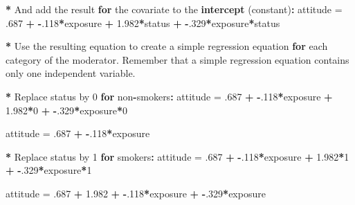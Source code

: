 \documentclass[a4paper]{book}
\newenvironment{Shaded}{\begin{snugshade}}{\end{snugshade}}
\newcommand{\KeywordTok}[1]{\textcolor[rgb]{0,0,0}{\textbf{#1}}}
\newcommand{\DecValTok}[1]{\textcolor[rgb]{0.00,0.00,0.00}{#1}}
\newcommand{\FloatTok}[1]{\textcolor[rgb]{0.00,0.00,0.00}{#1}}
\newcommand{\StringTok}[1]{\textcolor[rgb]{0.00,0.00,0.00}{#1}}
\newcommand{\ControlFlowTok}[1]{\textcolor[rgb]{0.00,0.00,0.00}{\textbf{#1}}}
\newcommand{\OperatorTok}[1]{\textcolor[rgb]{0.00,0.00,0.00}{\textbf{#1}}}
\newcommand{\NormalTok}[1]{#1}
\theoremstyle{definition}
\theoremstyle{definition}
\theoremstyle{definition}
\theoremstyle{remark}
\begin{document}
\begin{Shaded}
\begin{Highlighting}[]
\OperatorTok{*}\StringTok{ }\NormalTok{And add the result }\ControlFlowTok{for}\NormalTok{ the covariate to the }\KeywordTok{intercept}\NormalTok{ (constant)}\OperatorTok{:}
\NormalTok{attitude =}\StringTok{ }\NormalTok{.}\DecValTok{687} \OperatorTok{+}\StringTok{ }\OperatorTok{-}\NormalTok{.}\DecValTok{118}\OperatorTok{*}\NormalTok{exposure }\OperatorTok{+}\StringTok{ }\FloatTok{1.982}\OperatorTok{*}\NormalTok{status }\OperatorTok{+}\StringTok{ }\OperatorTok{-}\NormalTok{.}\DecValTok{329}\OperatorTok{*}\NormalTok{exposure}\OperatorTok{*}\NormalTok{status  }

\OperatorTok{*}\StringTok{ }\NormalTok{Use the resulting equation to create a simple regression equation }\ControlFlowTok{for}\NormalTok{ each}
\NormalTok{category of the moderator. Remember that a simple regression equation contains}
\NormalTok{only one independent variable.}

\OperatorTok{*}\StringTok{ }\NormalTok{Replace status by }\DecValTok{0} \ControlFlowTok{for}\NormalTok{ non}\OperatorTok{-}\NormalTok{smokers}\OperatorTok{:}\StringTok{  }
\StringTok{  }
\NormalTok{attitude =}\StringTok{ }\NormalTok{.}\DecValTok{687} \OperatorTok{+}\StringTok{ }\OperatorTok{-}\NormalTok{.}\DecValTok{118}\OperatorTok{*}\NormalTok{exposure }\OperatorTok{+}\StringTok{ }\FloatTok{1.982}\OperatorTok{*}\DecValTok{0} \OperatorTok{+}\StringTok{ }\OperatorTok{-}\NormalTok{.}\DecValTok{329}\OperatorTok{*}\NormalTok{exposure}\OperatorTok{*}\DecValTok{0}  
  
\NormalTok{attitude =}\StringTok{ }\NormalTok{.}\DecValTok{687} \OperatorTok{+}\StringTok{ }\OperatorTok{-}\NormalTok{.}\DecValTok{118}\OperatorTok{*}\NormalTok{exposure  }
  
\OperatorTok{*}\StringTok{ }\NormalTok{Replace status by }\DecValTok{1} \ControlFlowTok{for}\NormalTok{ smokers}\OperatorTok{:}
\StringTok{  }
\NormalTok{attitude =}\StringTok{ }\NormalTok{.}\DecValTok{687} \OperatorTok{+}\StringTok{ }\OperatorTok{-}\NormalTok{.}\DecValTok{118}\OperatorTok{*}\NormalTok{exposure }\OperatorTok{+}\StringTok{ }\FloatTok{1.982}\OperatorTok{*}\DecValTok{1} \OperatorTok{+}\StringTok{ }\OperatorTok{-}\NormalTok{.}\DecValTok{329}\OperatorTok{*}\NormalTok{exposure}\OperatorTok{*}\DecValTok{1}  
  
\NormalTok{attitude =}\StringTok{ }\NormalTok{.}\DecValTok{687} \OperatorTok{+}\StringTok{ }\FloatTok{1.982} \OperatorTok{+}\StringTok{ }\OperatorTok{-}\NormalTok{.}\DecValTok{118}\OperatorTok{*}\NormalTok{exposure }\OperatorTok{+}\StringTok{ }\OperatorTok{-}\NormalTok{.}\DecValTok{329}\OperatorTok{*}\NormalTok{exposure  }
  

\end{Highlighting}
\end{Shaded}
\end{document}
